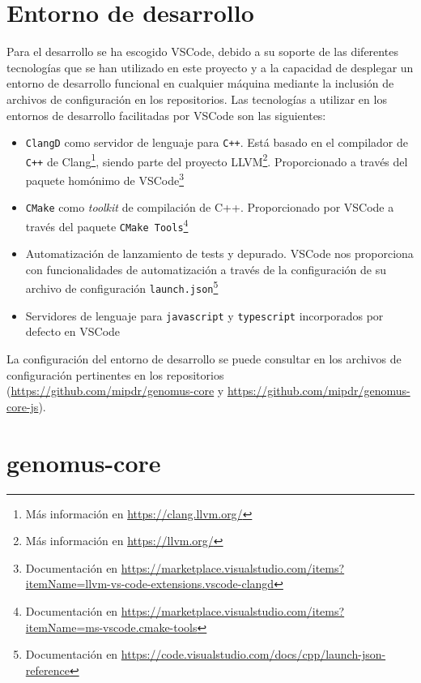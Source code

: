 \section{Entorno de desarrollo}

Para el desarrollo se ha escogido VSCode, debido a su soporte de las diferentes tecnologías que se han utilizado en este proyecto y a la capacidad de desplegar un entorno de desarrollo funcional en cualquier máquina mediante la inclusión de archivos de configuración en los repositorios. Las tecnologías a utilizar en los entornos de desarrollo facilitadas por VSCode son las siguientes:

\begin{itemize}
    \item \verb|ClangD| como servidor de lenguaje para \verb|C++|. Está basado en el compilador de \verb|C++| de Clang\footnote{Más información en \url{https://clang.llvm.org/}}, siendo parte del proyecto LLVM\footnote{Más información en \url{https://llvm.org/}}. Proporcionado a través del paquete homónimo de VSCode\footnote{Documentación en \url{https://marketplace.visualstudio.com/items?itemName=llvm-vs-code-extensions.vscode-clangd}}
    
    \item \verb|CMake| como \textit{toolkit} de compilación de C++. Proporcionado por VSCode a través del paquete \verb|CMake Tools|\footnote{Documentación en \url{https://marketplace.visualstudio.com/items?itemName=ms-vscode.cmake-tools}}
    
    \item Automatización de lanzamiento de tests y depurado. VSCode nos proporciona con funcionalidades de automatización a través de la configuración de su archivo de configuración \verb|launch.json|\footnote{Documentación en \url{https://code.visualstudio.com/docs/cpp/launch-json-reference}}
    
    \item Servidores de lenguaje para \verb|javascript| y \verb|typescript| incorporados por defecto en VSCode
\end{itemize}

La configuración del entorno de desarrollo se puede consultar en los archivos de configuración pertinentes en los repositorios (\url{https://github.com/mipdr/genomus-core} y \url{https://github.com/mipdr/genomus-core-js}).

\section{genomus-core}

